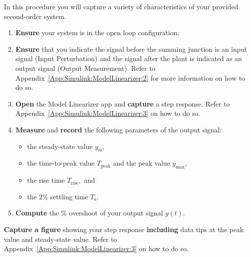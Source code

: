 \begin{procedure}[label={proc:lab2:p1}]
  In this procedure you will capture a variety of characteristics of
  your provided second-order system.
  \begin{enumerate}[label=(\arabic*)]
    \item{
      \textbf{Ensure} your system is in the open loop configuration.
    }
    \item{
      \textbf{Ensure} that you indicate the signal before the summing junction
      is an input signal (Input Perturbation) and the signal after the plant
      is indicated as an output signal (Output Measurement). Refer
      to Appendix~\ref{App:Simulink:ModelLinearizer:2} for more information
      on how to do so.
    }
    \item{
      \textbf{Open} the Model Linearizer app and \textbf{capture} a
      step response. Refer to Appendix~\ref{App:Simulink:ModelLinearizer:3}
      on how to do so.
    }
    \item{
      \textbf{Measure} and \textbf{record} the following parameters of the
      output signal:
      \begin{itemize}
        \item{
          the steady-state value \(y_{\mathrm{ss}},\)
        }
        \item{
          the time-to-peak value \(T_{\mathrm{peak}}\) and
          the peak value \(y_{\mathrm{max}},\)
        }
        \item{
          the rise time \(T_{\mathrm{rise}},\) and
        }
        \item{
          the \(2\%\) settling time \(T_{\mathrm{s}}.\)
        }
      \end{itemize}
      \label{proc:lab2:p1:4}
    }
    \item{
      \textbf{Compute} the \(\%\) overshoot of your output signal \(y(t).\)
    }
  \end{enumerate}
\end{procedure}
%
\begin{deliverable}[label={lab2:d1}]
  \textbf{Capture a figure} showing your step response \textbf{including}
  data tips at the peak value and steady-state value. Refer to
  Appendix~\ref{App:Simulink:ModelLinearizer:3} on how to do so.
\end{deliverable}

